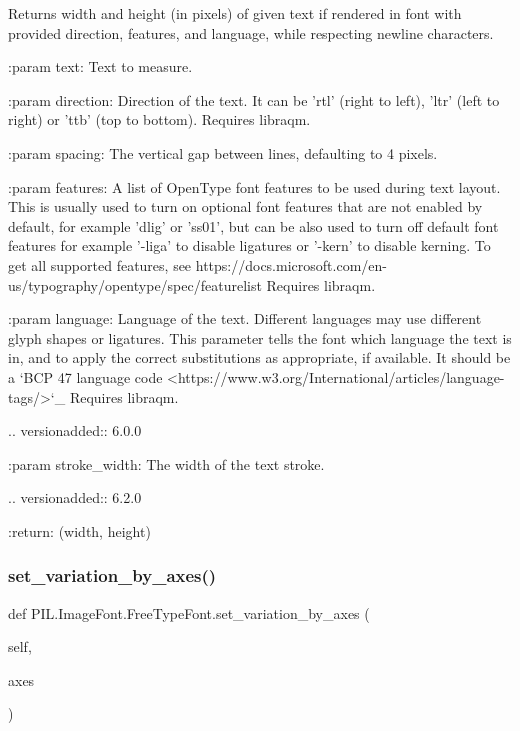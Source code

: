 \begin{DoxyVerb}Returns width and height (in pixels) of given text if rendered in font
with provided direction, features, and language, while respecting
newline characters.

:param text: Text to measure.

:param direction: Direction of the text. It can be 'rtl' (right to
          left), 'ltr' (left to right) or 'ttb' (top to bottom).
          Requires libraqm.

:param spacing: The vertical gap between lines, defaulting to 4 pixels.

:param features: A list of OpenType font features to be used during text
         layout. This is usually used to turn on optional
         font features that are not enabled by default,
         for example 'dlig' or 'ss01', but can be also
         used to turn off default font features for
         example '-liga' to disable ligatures or '-kern'
         to disable kerning.  To get all supported
         features, see
         https://docs.microsoft.com/en-us/typography/opentype/spec/featurelist
         Requires libraqm.

:param language: Language of the text. Different languages may use
         different glyph shapes or ligatures. This parameter tells
         the font which language the text is in, and to apply the
         correct substitutions as appropriate, if available.
         It should be a `BCP 47 language code
         <https://www.w3.org/International/articles/language-tags/>`_
         Requires libraqm.

         .. versionadded:: 6.0.0

:param stroke_width: The width of the text stroke.

         .. versionadded:: 6.2.0

:return: (width, height)
\end{DoxyVerb}
 \mbox{\label{classPIL_1_1ImageFont_1_1FreeTypeFont_af70c2b8a1eacf89d3a92f71fbb0ad88c}} 
\subsubsection{\texorpdfstring{set\+\_\+variation\+\_\+by\+\_\+axes()}{set\_variation\_by\_axes()}}
{\footnotesize\ttfamily def P\+I\+L.\+Image\+Font.\+Free\+Type\+Font.\+set\+\_\+variation\+\_\+by\+\_\+axes (\begin{DoxyParamCaption}\item[{}]{self,  }\item[{}]{axes }\end{DoxyParamCaption})}

